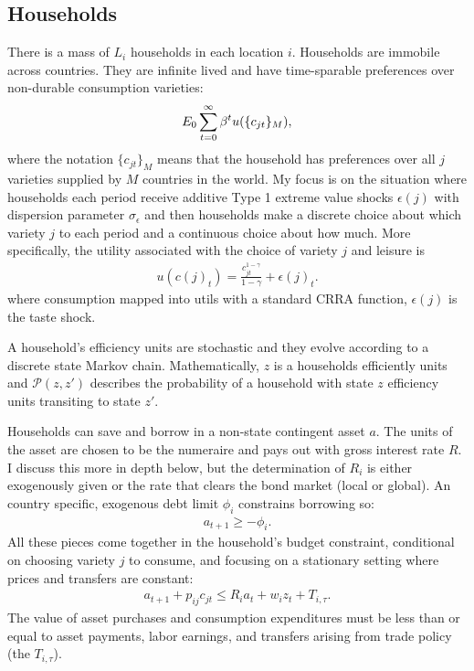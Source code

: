 \documentclass[12pt,pdftex]{article}
\begin{document}
\begin{onehalfspacing}
\subsection{Households}

There is a mass of $L_i$ households in each location $i$. Households are immobile across countries. They are infinite lived and have time-sparable preferences over non-durable consumption varieties:
\begin{align}
\small
E_{0} \sum_{t = 0}^{\infty} \beta^{t} u( \{ c_{jt} \}_{M}),
\end{align}
where the notation $\{ c_{jt} \}_{M}$ means that the household has preferences over all $j$ varieties supplied by $M$ countries in the world. My focus is on the situation where households each period receive additive Type 1 extreme value shocks $\epsilon(j)$ with dispersion parameter $\sigma_{\epsilon}$ and then households make a discrete choice about which variety $j$ to each period and a continuous choice about how much. More specifically, the utility associated with the choice of variety $j$ and leisure is
\begin{align}
u( c(j)_t ) =  \frac{ c_{jt} ^{1-\gamma}}{1- \gamma} + \epsilon(j)_t. \label{eq:utility}
\end{align}
where consumption mapped into utils with a standard CRRA function, $\epsilon(j)$ is the taste shock.

A household's efficiency units are stochastic and they evolve according to a discrete state Markov chain. Mathematically, $z$ is a households efficiently units and $\mathcal{P}(z,z')$ describes the probability of a household with state $z$ efficiency units transiting to state $z'$.

Households can save and borrow in a non-state contingent asset $a$. The units of the asset are chosen to be the numeraire and pays out with gross interest rate $R$. I discuss this more in depth below, but the determination of $R_{i}$ is either exogenously given or the rate that clears the bond market (local or global). An country specific, exogenous debt limit $\phi_{i}$ constrains borrowing so:
\begin{align}
a_{t+1} \geq - \phi_{i}.
\label{eq:borrowing-constraint}
\end{align}
All these pieces come together in the household's budget constraint, conditional on choosing variety $j$ to consume, and focusing on a stationary setting where prices and transfers are constant:
\begin{align}
a_{t+1} + p_{ij}c_{jt}  \leq    R_{i} a_{t} + w_{i} z_{t} + T_{i,\tau}.\label{eq:trade-budget-constraint}
\end{align}
The value of asset purchases and consumption expenditures must be less than or equal to asset payments, labor earnings, and transfers arising from trade policy (the $T_{i,\tau}$).


\end{onehalfspacing}
\end{document}
